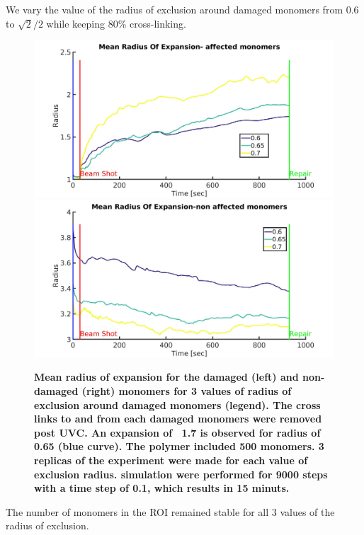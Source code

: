 \documentclass[12pt]{report}
\begin{document}
   We vary the value of the radius of exclusion around damaged monomers from 0.6 to $\sqrt{2}/2$ while keeping 80\% cross-linking. 
   
   
	\begin{figure}[H]
	\includegraphics[width=0.5\linewidth, height=0.3\textheight]{Images/ExludeAroundDamagedMonomers/BreakDamagedCrosslinks/06/meanRadiusOfExpansionAffected}
	\includegraphics[width=0.5\linewidth, height=0.3\textheight]{Images/ExludeAroundDamagedMonomers/BreakDamagedCrosslinks/06/meanRadiusOfExpansionNonAffected}
	\caption{\tiny{\textbf{Mean radius of expansion for the damaged (left) and non-damaged (right) monomers for 3 values of radius of exclusion around damaged monomers (legend). The cross links to and from each damaged monomers were removed post UVC. An expansion of ~1.7 is observed for radius of 0.65 (blue curve). The polymer included 500 monomers. 3 replicas of the experiment were made for each value of exclusion radius. simulation were performed for 9000 steps with a time step of 0.1, which results in 15 minuts.}}}
	\label{fig:meanRadiusOfExpansionAffectedVolumeOfExclusionParameterFitting}
	\end{figure}
   
   The number of monomers in the ROI remained stable for all 3 values of the radius of exclusion.
   
\end{document}
